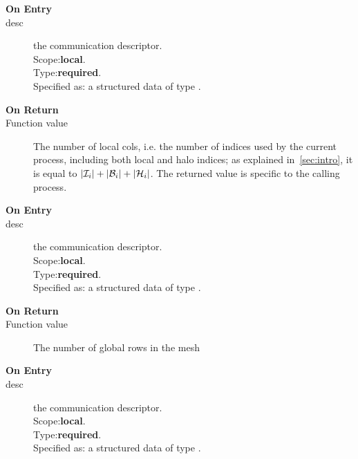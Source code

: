

\begin{description}
\item[\bf On Entry]
\item[desc] the communication descriptor.\\
Scope:{\bf local}.\\
Type:{\bf required}.\\
Specified as: a structured data of type \descdata.
\end{description}

\begin{description}
\item[\bf On Return]
\item[Function value] The number of local cols, i.e. the number of
  indices used by the current process, including both local and halo
  indices; as explained in~\ref{sec:intro}, 
  it is equal to  $|{\cal I}_i| + |{\cal B}_i| +|{\cal H}_i|$. The
  returned value is specific to the calling process. 
\end{description}




\begin{description}
\item[\bf On Entry]
\item[desc] the communication descriptor.\\
Scope:{\bf local}.\\
Type:{\bf required}.\\
Specified as: a structured data of type \descdata.
\end{description}

\begin{description}
\item[\bf On Return]
\item[Function value] The number of global rows in the mesh
\end{description}



\begin{description}
\item[\bf On Entry]
\item[desc] the communication descriptor.\\
Scope:{\bf local}.\\
Type:{\bf required}.\\
Specified as: a structured data of type \descdata.
\end{description}

